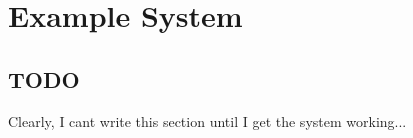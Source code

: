 \chapter{Example System}\label{ch:example-run}

\section{TODO}

Clearly, I cant write this section until I get the system working...

